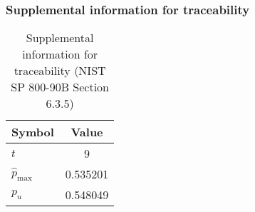 \documentclass[a3paper,xelatex,english]{bxjsarticle}
\begin{document}
\subsubsection{Supplemental information for traceability}
\renewcommand{\arraystretch}{1.8}
\begin{table}[h]
\caption{Supplemental information for traceability (NIST SP 800-90B Section 6.3.5)}
\begin{center}
\begin{tabular}{|l|c|}
\hline 
\rowcolor{anotherlightblue} %
Symbol				& Value \\ \hline 
$t$				&        9\\ \hline 
$\hat{p}_{\textrm{max}}$ 			& 0.535201\\ \hline
$p_u$				& 0.548049\\ \hline
\end{tabular}
\end{center}
\end{table}
\renewcommand{\arraystretch}{1.4}
\clearpage
\end{document}
